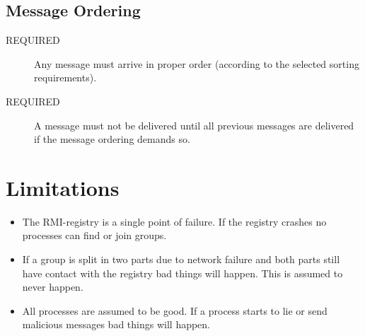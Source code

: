\documentclass[english]{article}
\begin{document}
\subsection{Message Ordering}
\begin{description}
\item[REQUIRED] Any message must arrive in proper order (according to the selected sorting requirements).

\item[REQUIRED] A message must not be delivered until all previous messages are delivered if the message ordering demands so.
\end{description}



\section{Limitations}
\begin{itemize}
\item The RMI-registry is a single point of failure. If the registry crashes no processes can find or join groups. 

\item If a group is split in two parts due to network failure and both parts still have contact  with the registry bad things will happen. This is assumed to never happen.

\item All processes are assumed to be good. If a process starts to lie or send malicious messages bad things will happen.
\end{itemize}
\end{document}
